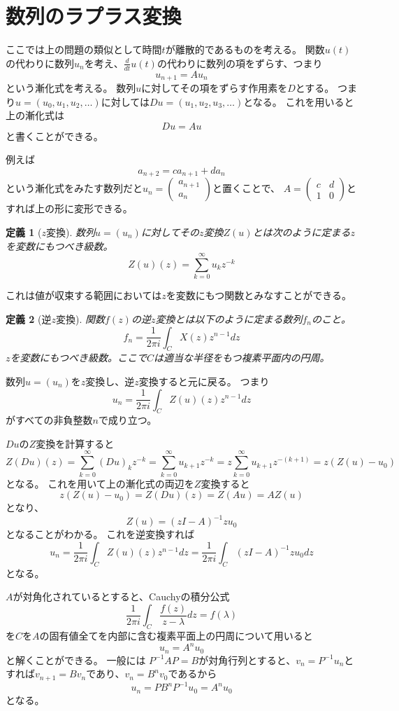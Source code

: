\documentclass{jsarticle}
\newtheorem{dfn}{定義}
\begin{document}
\section{数列のラプラス変換}
ここでは上の問題の類似として時間$t$が離散的であるものを考える。
関数$u(t)$の代わりに数列$u_n$を考え、$\frac{d}{dt}u(t)$の代わりに数列の項をずらす、つまり
\[
u_{n+1}=Au_n
\]
という漸化式を考える。
数列$u$に対してその項をずらす作用素を$D$とする。
つまり$u=(u_0,u_1,u_2,\ldots)$に対しては$Du=(u_1,u_2,u_3,\ldots)$となる。
これを用いると上の漸化式は
\[
Du=Au
\]
と書くことができる。

例えば
\[
a_{n+2}=ca_{n+1}+da_n
\]
という漸化式をみたす数列だと$u_n=\begin{pmatrix}a_{n+1}\\a_n\end{pmatrix}$と置くことで、
$A=\begin{pmatrix}c&d\\1&0\end{pmatrix}$とすれば上の形に変形できる。

\begin{dfn}[$z$変換]
数列$u=(u_n)$に対してその$z$変換$Z(u)$とは次のように定まる$z$を変数にもつべき級数。
\[
Z(u)(z)=\sum_{k=0}^\infty u_kz^{-k}
\]
\end{dfn}
これは値が収束する範囲においては$z$を変数にもつ関数とみなすことができる。

\begin{dfn}[逆$z$変換]
関数$f(z)$の逆$z$変換とは以下のように定まる数列$f_n$のこと。
\[
f_n=\frac{1}{2\pi i}\int_CX(z)z^{n-1}dz
\]
$z$を変数にもつべき級数。ここで$C$は適当な半径をもつ複素平面内の円周。
\end{dfn}

数列$u=(u_n)$を$z$変換し、逆$z$変換すると元に戻る。
つまり
\[
u_n=\frac{1}{2\pi i}\int_CZ(u)(z)z^{n-1}dz
\]
がすべての非負整数$n$で成り立つ。

$Du$の$Z$変換を計算すると
\[
Z(Du)(z)=\sum_{k=0}^\infty(Du)_kz^{-k}=\sum^\infty_{k=0}u_{k+1}z^{-k}=z\sum^\infty_{k=0}u_{k+1}z^{-(k+1)}=z(Z(u)-u_0)
\]
となる。
これを用いて上の漸化式の両辺を$Z$変換すると
\[
z(Z(u)-u_0)=Z(Du)(z)=Z(Au)=AZ(u)
\]
となり、
\[
Z(u)=(zI-A)^{-1}zu_0
\]
となることがわかる。
これを逆変換すれば
\[
u_n=\frac{1}{2\pi i}\int_CZ(u)(z)z^{n-1}dz=\frac{1}{2\pi i}\int_C(zI-A)^{-1}zu_0dz
\]
となる。

$A$が対角化されているとすると、Cauchyの積分公式
\[
\frac{1}{2\pi i}\int_C\frac{f(z)}{z-\lambda}dz=f(\lambda)
\]
を$C$を$A$の固有値全てを内部に含む複素平面上の円周について用いると
\[
u_n=A^nu_0
\]
と解くことができる。
一般には
$P^{-1}AP=B$が対角行列とすると、$v_n=P^{-1}u_n$とすれば$v_{n+1}=Bv_n$であり、$v_n=B^nv_0$であるから
\[
u_n=PB^nP^{-1}u_0=A^nu_0
\]
となる。
\end{document}

